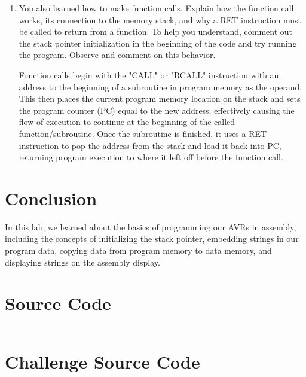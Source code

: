 \documentclass[12pt,letterpaper]{article}
\begin{document}
\begin{enumerate}
    \item You also learned how to make function calls. Explain how the function
        call works, its connection to the memory stack, and why a RET
        instruction must be called to return from a function. To help you
        understand, comment out the stack pointer initialization in the
        beginning of the code and try running the program. Observe and comment
        on this behavior.

        Function calls begin with the "CALL" or "RCALL" instruction with an
        address to the beginning of a subroutine in program memory as the
        operand.  This then places the current program memory location on the
        stack and sets the program counter (PC) equal to the new address,
        effectively causing the flow of execution to continue at the beginning
        of the called function/subroutine.  Once the subroutine is finished, it
        uses a RET instruction to pop the address from the stack and load it
        back into PC, returning program execution to where it left off before
        the function call.

\end{enumerate}

\section{Conclusion}

In this lab, we learned about the basics of programming our AVRs in assembly,
including the concepts of initializing the stack pointer, embedding strings in
our program data, copying data from program memory to data memory, and
displaying strings on the assembly display.

\section{Source Code}

\begin{verbatim}
\end{verbatim}

\pagebreak

\section{Challenge Source Code}
\end{document}
